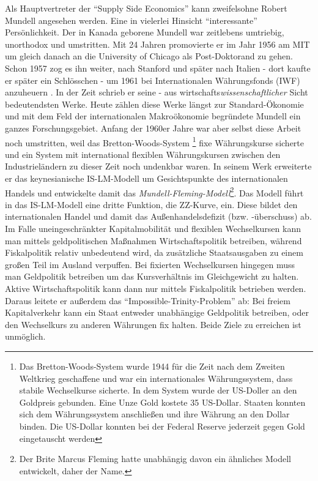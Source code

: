 Als Hauptvertreter der "`Supply Side Economics"' kann zweifelsohne Robert Mundell angesehen werden. Eine in vielerlei Hinsicht "`interessante"' Persönlichkeit. Der in Kanada geborene Mundell war zeitlebens umtriebig, unorthodox und umstritten. Mit 24 Jahren promovierte er im Jahr 1956 am MIT um gleich danach an die University of Chicago als Post-Doktorand zu gehen. Schon 1957 zog es ihn weiter, nach Stanford und später nach Italien - dort kaufte er später ein Schlösschen - um 1961 bei Internationalen Währungsfonds (IWF) anzuheuern \parencite{Mundell1999}. In der Zeit schrieb er seine - aus wirtschafts\textit{wissenschaftlicher} Sicht bedeutendsten Werke. Heute zählen diese Werke längst zur Standard-Ökonomie und mit dem Feld der internationalen Makroökonomie begründete Mundell ein ganzes Forschungsgebiet. Anfang der 1960er Jahre war aber selbst diese Arbeit noch umstritten, weil das Bretton-Woods-System \footnote{Das Bretton-Woods-System wurde 1944 für die Zeit nach dem Zweiten Weltkrieg geschaffene und war ein internationales Währungssystem, dass stabile Wechselkurse sicherte. In dem System wurde der US-Doller an den Goldpreis gebunden. Eine Unze Gold kostete 35 US-Dollar. Staaten konnten sich dem Währungssystem anschließen und ihre Währung an den Dollar binden. Die US-Dollar konnten bei der Federal Reserve jederzeit gegen Gold eingetauscht werden} fixe Währungskurse sicherte und ein System mit international flexiblen Währungskursen zwischen den Industrieländern zu dieser Zeit noch undenkbar waren. In seinem Werk \textcite{Mundell1963} erweiterte er das keynesianische IS-LM-Modell um Gesichtspunkte des internationalen Handels und entwickelte damit das \textit{Mundell-Fleming-Modell}\footnote{Der Brite Marcus Fleming hatte unabhängig davon ein ähnliches Modell entwickelt, daher der Name.}. Das Modell führt in das IS-LM-Modell eine dritte Funktion, die ZZ-Kurve, ein. Diese bildet den internationalen Handel und damit das Außenhandelsdefizit (bzw. -überschuss) ab. Im Falle uneingeschränkter Kapitalmobilität und flexiblen Wechselkursen kann man mittels geldpolitischen Maßnahmen Wirtschaftspolitik betreiben, während Fiskalpolitik relativ unbedeutend wird, da zusätzliche Staatsausgaben zu einem großen Teil im Ausland verpuffen. Bei fixierten Wechselkursen hingegen muss man Geldpolitik betreiben um das Kursverhältnis im Gleichgewicht zu halten. Aktive Wirtschaftspolitik kann dann nur mittels Fiskalpolitik betrieben werden. Daraus leitete er außerdem das "`Impossible-Trinity-Problem"' ab: Bei freiem Kapitalverkehr kann ein Staat entweder unabhängige Geldpolitik betreiben, oder den Wechselkurs zu anderen Währungen fix halten. Beide Ziele zu erreichen ist unmöglich.
